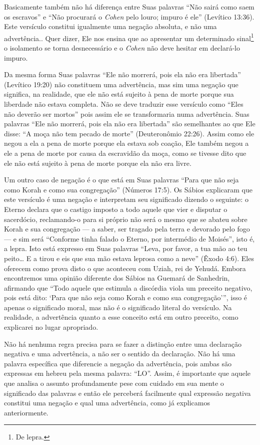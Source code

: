 Basicamente também não há diferença entre Suas palavras ``Não sairá como saem os escravos'' e ``Não procurará o \textit{Cohen} pelo louro;
impuro
é ele'' (Levítico 13:36). Este versículo constitui igualmente uma
negação absoluta, e não uma advertência.. Quer dizer, Ele nos ensina que ao
apresentar um determinado sinal\footnote{De lepra.} o isolamento se
torna desnecessário e o \textit{Cohen} não deve hesitar em declará-lo impuro.

Da mesma forma Suas palavras ``Ele não morrerá, pois ela não era
libertada'' (Levítico 19:20) não constituem uma advertência, mas sim uma
negação que significa, na realidade, que ele não está sujeito à pena de
morte porque sua liberdade não estava completa. Não se deve traduzir
esse versículo como ``Eles não deverão ser mortos'' pois assim ele se
transformaria numa advertência. Suas palavras ``Ele não morrerá, pois
ela não era libertada'' são semelhantes ao que Ele disse: ``A moça não tem pecado de morte''
(Deuteronômio 22:26). Assim como ele negou a ela a pena de morte porque
ela estava sob coação, Ele também negou a ele a pena de morte por causa
da escravidão da moça, como se tivesse dito que ele não está sujeito à
pena de morte porque ela não era livre.

Um outro caso de negação é o que está em Suas palavras ``Para que não
seja como Korah e como sua congregação'' (Números 17:5). Os Sábios
explicaram que este versículo é uma negação e interpretam seu
significado dizendo o seguinte: o Eterno declara que o castigo imposto
a todo aquele que vier e disputar o sacerdócio, reclamando-o para si
próprio não será o mesmo que se abateu sobre Korah e sua congregação ---
a saber, ser tragado pela terra e devorado pelo fogo --- e sim será
``Conforme tinha falado o Eterno, por intermédio de Moisés'', isto é, a
lepra. Isto está expresso em Suas palavras ``Leva, por favor, a tua mão
ao teu peito\ldots{} E a tirou e eis que sua mão estava leprosa como a neve''
(Êxodo 4:6). Eles oferecem como prova disto o que aconteceu com Uziah,
rei de Yehudá. Embora encontremos uma opinião diferente dos Sábios na
Guemará de Sanhedrin, afirmando que ``Todo aquele que estimula a
discórdia viola um preceito negativo, pois está dito: `Para que não seja
como Korah e como sua congregação''', isso é apenas o significado moral,
mas não é o significado literal do versículo. Na realidade, a
advertência quanto a esse conceito está em outro preceito, como
explicarei no lugar apropriado.

Não há nenhuma regra precisa para se fazer a distinção entre uma
declaração negativa e uma advertência, a não ser o sentido da
declaração. Não há uma palavra específica que diferencie a negação da
advertência, pois ambas são expressas em hebreu pela mesma palavra:
``LO''. Assim, é importante que aquele que analisa o assunto
profundamente pese com cuidado em sua mente o significado das palavras e
então ele perceberá facilmente qual expressão negativa constitui uma
negação e qual uma advertência, como já explicamos anteriormente.

